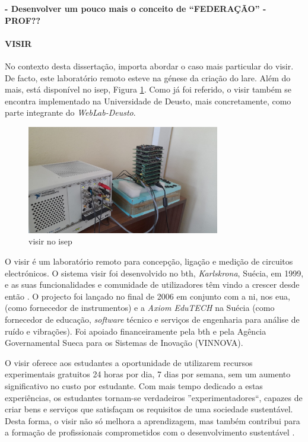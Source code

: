 \textbf{- Desenvolver um pouco mais o conceito de ``FEDERAÇÃO'' - PROF??}

\paragraph{VISIR}
\label{sec:visir}
No contexto desta dissertação, importa abordar o caso mais particular do \acrshort{visir}. De facto, este \acrshort{laboratório remoto} esteve na génese da criação do \acrshort{lare}. Além do mais, está disponível no \acrshort{isep}, Figura \ref{fig:visirISEP}. Como já foi referido, o \acrshort{visir} também se encontra implementado na Universidade de Deusto, mais concretamente, como parte integrante do \textit{WebLab-Deusto}.

\begin{figure}[hbtp]
    \centering
    \includegraphics[width=0.75\textwidth]{figures/visirISEP.jpeg}
    \caption{\acrshort{visir} no \acrshort{isep}}
    \label{fig:visirISEP}
\end{figure}

O \acrshort{visir} é um \acrshort{laboratório remoto} para concepção, ligação e medição de circuitos electrónicos. O sistema \acrshort{visir} foi desenvolvido no \acrfull{bth}, \textit{Karlskrona}, Suécia, em 1999, e as suas funcionalidades e comunidade de utilizadores têm vindo a crescer desde então \cite{RemoteLabsImpactVISIR}. O projecto foi lançado no final de 2006 em conjunto com a \acrshort{ni}, nos \acrshort{eua}, (como fornecedor de instrumentos) e a \textit{Axiom EduTECH} na Suécia (como fornecedor de educação, \textit{software} técnico e serviços de engenharia para análise de ruído e vibrações). Foi apoiado financeiramente pela \acrshort{bth} e pela Agência Governamental Sueca para os Sistemas de Inovação (VINNOVA)\cite{VISIRExperiencesChallenges}.

O \acrshort{visir} oferece aos estudantes a oportunidade de utilizarem recursos experimentais gratuitos 24 horas por dia, 7 dias por semana, sem um aumento significativo no custo por estudante. Com mais tempo dedicado a estas experiências, os estudantes tornam-se verdadeiros ''experimentadores``, capazes de criar bens e serviços que satisfaçam os requisitos de uma sociedade sustentável. Desta forma, o \acrshort{visir} não só melhora a aprendizagem, mas também contribui para a formação de profissionais comprometidos com o desenvolvimento sustentável \cite{OpenLabs77:online}.

